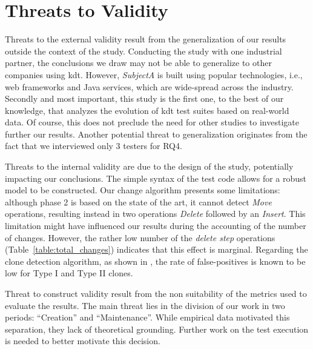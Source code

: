 \section{Threats to Validity}

Threats to the external validity result from the generalization of our results outside the context of the study. Conducting the study with one industrial partner, the conclusions we draw may not be able to generalize to other companies using \gls{kdt}. However, \emph{SubjectA} is built using popular technologies, i.e., web frameworks and Java services, which are wide-spread across the industry. Secondly and most important, this study is the first one, to the best of our knowledge, that analyzes the evolution of \gls{kdt} test suites based on real-world data. Of course, this does not preclude the need for other studies to investigate further our results. Another potential threat to generalization originates from the fact that we interviewed only 3 testers for RQ4. 

Threats to the internal validity are due to the design of the study, potentially impacting our conclusions. The simple syntax of the test code allows for a robust model to be constructed. Our change algorithm presents some limitations: although phase 2 is based on the state of the art, it cannot detect \emph{Move} operations, resulting instead in two operations \emph{Delete} followed by an \emph{Insert}. This limitation might have influenced our results during the accounting of the number of changes. However, the rather low number of the \emph{delete step} operations (Table~\ref{table:total_changes}) indicates that this effect is marginal. Regarding the clone detection algorithm, as shown in \cite{Roy2009}, the rate of false-positives is known to be low for Type I and Type II clones.

Threat to construct validity result from the non suitability of the metrics used to evaluate the results. The main threat lies in the division of our work in two periods: ``Creation'' and ``Maintenance''. While empirical data motivated this separation, they lack of theoretical grounding. Further work on the test execution is needed to better motivate this decision.
